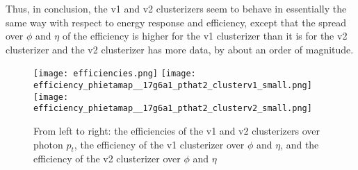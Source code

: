 Thus, in conclusion, the v1 and v2 clusterizers seem to behave in essentially the same way with respect to energy response and efficiency, except that the spread over $\phi$ and $\eta$ of the efficiency is higher for the v1 clusterizer than it is for the v2 clusterizer and the v2 clusterizer has more data, by about an order of magnitude.

\begin{figure}
\texttt{[image: efficiencies.png]}
\texttt{[image: efficiency\_phietamap\_\_17g6a1\_pthat2\_clusterv1\_small.png]}
\texttt{[image: efficiency\_phietamap\_\_17g6a1\_pthat2\_clusterv2\_small.png]}
\caption{From left to right: the efficiencies of the v1 and v2 clusterizers over photon $p_t$, the efficiency of the v1 clusterizer over $\phi$ and $\eta$, and the efficiency of the v2 clusterizer over $\phi$ and $\eta$}
\end{figure}
